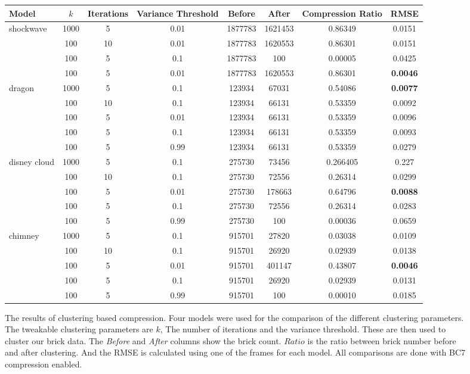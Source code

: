 \begin{figure}[H]
{    \begin{tabular}{|l|ccc|cccc|}
        \toprule
        \hline
        Model & $k$ & Iterations & Variance Threshold & Before & After & Compression Ratio & RMSE \\
        \hline
        \midrule
        shockwave & 1000 & 5 & 0.01 & 1877783 & 1621453 & 0.86349 & 0.0151 \\
        & 100 & 10 & 0.01 & 1877783 & 1620553 & 0.86301 & 0.0151 \\
        & 100 & 5 & 0.1 & 1877783 & 100 & 0.00005 & 0.0425 \\
        & 100 & 5 & 0.01 & 1877783 & 1620553 & 0.86301 & \textbf{0.0046} \\
        \hline
        \midrule
        dragon & 1000 & 5 & 0.1 & 123934 & 67031 & 0.54086 & \textbf{0.0077} \\
        & 100 & 10 & 0.1 & 123934 & 66131 & 0.53359 & 0.0092 \\
        & 100 & 5 & 0.01 & 123934 & 66131 & 0.53359 & 0.0096 \\
        & 100 & 5 & 0.1 & 123934 & 66131 & 0.53359 & 0.0093 \\
        & 100 & 5 & 0.99 & 123934 & 66131 & 0.53359 & 0.0279 \\
        \hline
        \midrule
        disney cloud & 1000 & 5 & 0.1 & 275730 & 73456 & 0.266405 & 0.227 \\
        & 100 & 10 & 0.1 & 275730 & 72556 & 0.26314 & 0.0299 \\
        & 100 & 5 & 0.01 & 275730 & 178663 & 0.64796 & \textbf{0.0088} \\
        & 100 & 5 & 0.1 & 275730 & 72556 & 0.26314 & 0.0283 \\
        & 100 & 5 & 0.99 & 275730 & 100 & 0.00036 & 0.0659 \\
        \hline
        \midrule
        chimney & 1000 & 5 & 0.1 & 915701 & 27820 & 0.03038 & 0.0109 \\
        & 100 & 10 & 0.1 & 915701 & 26920 & 0.02939 & 0.0138 \\
        & 100 & 5 & 0.01 & 915701 & 401147 & 0.43807 & \textbf{0.0046} \\
        & 100 & 5 & 0.1 & 915701 & 26920 & 0.02939 & 0.0131 \\
        & 100 & 5 & 0.99 & 915701 & 100 & 0.00010 & 0.0185 \\
        \hline
        \bottomrule
      \end{tabular}
    \label{tab:block_compression_visualized:table}
    }

    \caption{The results of clustering based compression. Four models were used for the comparison of the different clustering parameters. The tweakable clustering parameters are $k$, The number of iterations and the variance threshold. These are then used to cluster our brick data. The \textit{Before} and \textit{After} columns show the brick count. $Ratio$ is the ratio between brick number before and after clustering. And the RMSE is calculated using one of the frames for each model. All comparisons are done with BC7 compression enabled.} \label{fig:block_compression_visualized}
\end{figure}

